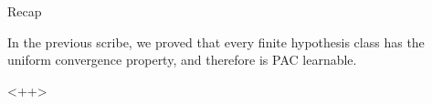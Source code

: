 \documentclass[11pt,a4paper]{article}
\begin{document}
\makeheader%

\begin{ssection}{Recap}

	In the previous scribe, we proved that every finite hypothesis class has the uniform convergence property, and therefore is PAC learnable.

\end{ssection}<++>
\end{document}
